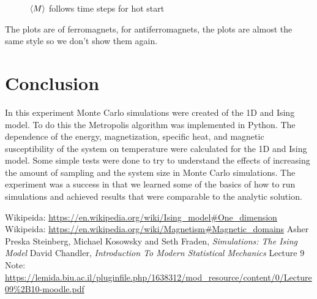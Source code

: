 \documentclass[12pt]{article}
\begin{document}
\begin{figure}[H]
		 \quad
		\caption{$\braket{M}$ follows time steps for hot start}
		\label{fig:hot start equilibrium}
	\end{figure}
	
	The plots are of ferromagnets, for antiferromagnets, the plots are almost the same style so we don't show them again.
	
	\section{Conclusion}
	\label{sec: conclusion}
	In this experiment Monte Carlo simulations were created of the 1D and Ising model. To do this the Metropolis algorithm was implemented in Python. The dependence of the energy, magnetization, specific heat, and magnetic susceptibility of the system on temperature were calculated for the 1D and Ising model. Some simple tests were done to try to understand the effects of increasing the amount of sampling and the system size in Monte Carlo simulations. The experiment was a success in that we learned some of the basics of how to run simulations and achieved results
	that were comparable to the analytic solution. 
	
	\begin{thebibliography}{99}
		Wikipeida: \url{https://en.wikipedia.org/wiki/Ising_model#One_dimension}
		Wikipeida: \url{https://en.wikipedia.org/wiki/Magnetism#Magnetic_domains}
		Asher Preska Steinberg, Michael Kosowsky and Seth Fraden, \textit{Simulations: The Ising Model}
		David Chandler, \textit{Introduction To Modern Statistical Mechanics}
		Lecture 9 Note: \url{https://lemida.biu.ac.il/pluginfile.php/1638312/mod_resource/content/0/Lecture09%2B10-moodle.pdf}
		\end{thebibliography}
		
	
\end{document}
